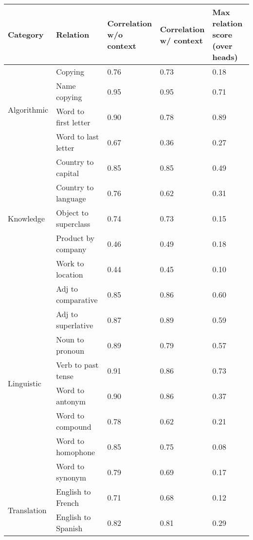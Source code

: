 \begin{tabular}{lllll}
\toprule
Category & Relation & \makecell{Correlation\\w/o context} & \makecell{Correlation\\w/ context} & \makecell{Max relation score\\(over heads)} \\
\midrule
\multirow{4}{*}{Algorithmic} & Copying & 0.76 & 0.73 & 0.18 \\
 & Name copying & 0.95 & 0.95 & 0.71 \\
 & Word to first letter & 0.90 & 0.78 & 0.89 \\
 & Word to last letter & 0.67 & 0.36 & 0.27 \\
\multirow{5}{*}{Knowledge} & Country to capital & 0.85 & 0.85 & 0.49 \\
 & Country to language & 0.76 & 0.62 & 0.31 \\
 & Object to superclass & 0.74 & 0.73 & 0.15 \\
 & Product by company & 0.46 & 0.49 & 0.18 \\
 & Work to location & 0.44 & 0.45 & 0.10 \\
\multirow{8}{*}{Linguistic} & Adj to comparative & 0.85 & 0.86 & 0.60 \\
 & Adj to superlative & 0.87 & 0.89 & 0.59 \\
 & Noun to pronoun & 0.89 & 0.79 & 0.57 \\
 & Verb to past tense & 0.91 & 0.86 & 0.73 \\
 & Word to antonym & 0.90 & 0.86 & 0.37 \\
 & Word to compound & 0.78 & 0.62 & 0.21 \\
 & Word to homophone & 0.85 & 0.75 & 0.08 \\
 & Word to synonym & 0.79 & 0.69 & 0.17 \\
\multirow{2}{*}{Translation} & English to French & 0.71 & 0.68 & 0.12 \\
 & English to Spanish & 0.82 & 0.81 & 0.29 \\
\bottomrule
\end{tabular}
